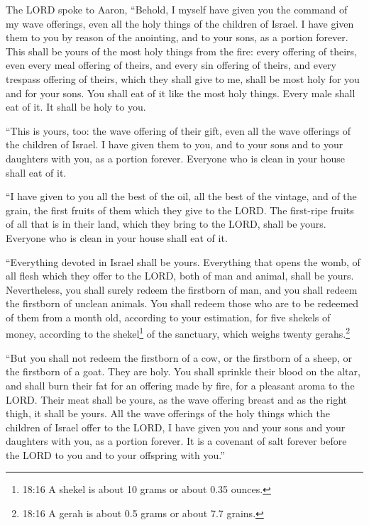 \myverse{}The LORD spoke to Aaron, “Behold, I myself have given you the
command of my wave offerings, even all the holy things of the children of Israel. I have given them to
you by reason of the anointing, and to your sons, as a portion forever.
\myverse{}This shall be yours of the most holy things from the fire: every offering of
theirs, even every meal offering of theirs, and every sin offering of theirs, and every trespass offering
of theirs, which they shall give to me, shall be most holy for you and for your sons.
\myverse{}You shall eat of it like the most holy things. Every male shall eat of it.
It shall be holy to you.


\myverse{}“This is yours, too: the wave offering of their gift, even all
the wave offerings of the children of Israel. I have given them to you, and to your sons and to your daughters
with you, as a portion forever. Everyone who is clean in your house shall eat of it.


\myverse{}“I have given to you all the best of the oil, all the best of
the vintage, and of the grain, the first fruits of them which they give to the LORD.
\myverse{}The first-ripe fruits of all that is in their land, which they bring to the
LORD, shall be yours. Everyone who is clean in your house shall eat of it.


\myverse{}“Everything devoted in Israel shall be yours.
\myverse{}Everything that opens the womb, of all flesh which they offer to the LORD,
both of man and animal, shall be yours. Nevertheless, you shall surely redeem the firstborn of man, and
you shall redeem the firstborn of unclean animals.
\myverse{}You shall redeem those who are to be redeemed of them from a month old, according
to your estimation, for five shekels of money, according to the shekel\footnote{ 18:16 A shekel is about 10 grams or about 0.35 ounces.} of the sanctuary, which weighs twenty
gerahs.\footnote{ 18:16 A gerah is about 0.5 grams or about 7.7 grains.}


\myverse{}“But you shall not redeem the firstborn of a cow, or the firstborn
of a sheep, or the firstborn of a goat. They are holy. You shall sprinkle their blood on the altar, and
shall burn their fat for an offering made by fire, for a pleasant aroma to the LORD.
\myverse{}Their meat shall be yours, as the wave offering breast and as the right thigh,
it shall be yours.
\myverse{}All the wave offerings of the holy things which the children of Israel offer
to the LORD, I have given you and your sons and your daughters with you, as a portion forever. It is a
covenant of salt forever before the LORD to you and to your offspring with you.”


